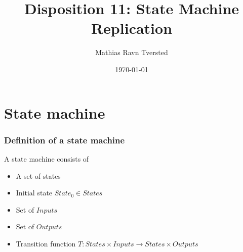 
\title{Disposition 11: State Machine Replication}   
\author{Mathias Ravn Tversted} 
\date{\today} 












\frame{\titlepage} 



\section{State machine}
        \begin{frame}
            \frametitle{Definition of a state machine}
                A state machine consists of 
                \begin{itemize}
                    \item A set of states
                    \item Initial state $State_0 \in States$
                    \item Set of $Inputs$
                    \item Set of $Outputs$
                    \item Transition function $T: States \times Inputs \rightarrow States \times Outputs$
                \end{itemize}
        \end{frame}
